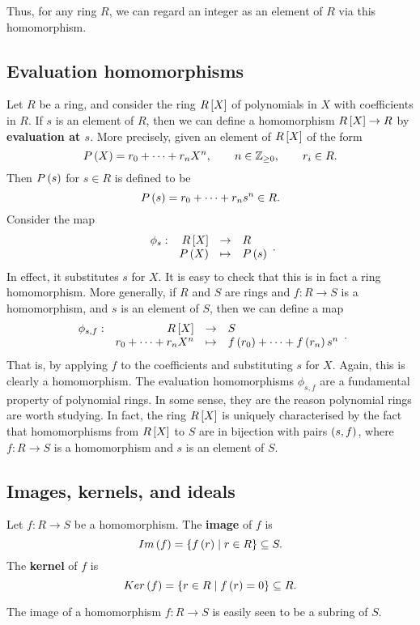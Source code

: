 Thus, for any ring $ R $, we can regard an integer as an element of $ R $ via this homomorphism.

\pagebreak

\subsection{Evaluation homomorphisms}

Let $ R $ be a ring, and consider the ring $ R\sb{X} $ of polynomials in $ X $ with coefficients in $ R $. If $ s $ is an element of $ R $, then we can define a homomorphism $ R\sb{X} \to R $ by \textbf{evaluation at $ s $}. More precisely, given an element of $ R\sb{X} $ of the form
$$ P\rb{X} = r_0 + \dots + r_nX^n, \qquad n \in \Z_{\ge 0}, \qquad r_i \in R. $$
Then $ P\rb{s} $ for $ s \in R $ is defined to be
$$ P\rb{s} = r_0 + \dots + r_ns^n \in R. $$
Consider the map
$$ \function[\phi_s]{R\sb{X}}{R}{P\rb{X}}{P\rb{s}}. $$
In effect, it substitutes $ s $ for $ X $. It is easy to check that this is in fact a ring homomorphism. More generally, if $ R $ and $ S $ are rings and $ f : R \to S $ is a homomorphism, and $ s $ is an element of $ S $, then we can define a map
$$ \function[\phi_{s, f}]{R\sb{X}}{S}{r_0 + \dots + r_nX^n}{f\rb{r_0} + \dots + f\rb{r_n}s^n}. $$
That is, by applying $ f $ to the coefficients and substituting $ s $ for $ X $. Again, this is clearly a homomorphism. The evaluation homomorphisms $ \phi_{s, f} $ are a fundamental property of polynomial rings. In some sense, they are the reason polynomial rings are worth studying. In fact, the ring $ R\sb{X} $ is uniquely characterised by the fact that homomorphisms from $ R\sb{X} $ to $ S $ are in bijection with pairs $ \rb{s, f} $, where $ f : R \to S $ is a homomorphism and $ s $ is an element of $ S $.

\subsection{Images, kernels, and ideals}

\begin{definition}
Let $ f : R \to S $ be a homomorphism. The \textbf{image} of $ f $ is
$$ Im\rb{f} = \cb{f\rb{r} \mid r \in R} \subseteq S. $$
The \textbf{kernel} of $ f $ is
$$ Ker\rb{f} = \cb{r \in R \mid f\rb{r} = 0} \subseteq R. $$
\end{definition}

The image of a homomorphism $ f : R \to S $ is easily seen to be a subring of $ S $.

